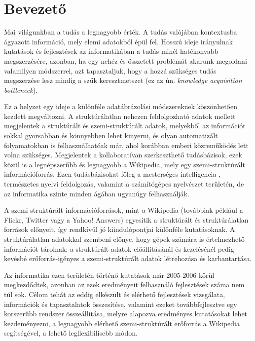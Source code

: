 
\chapter*{Bevezető}
\label{cha:intro}

Mai világunkban a tudás a legnagyobb érték. A tudás valójában kontextusba ágyazott információ, mely elemi adatokból épül fel. Hosszú ideje irányulnak kutatások és fejlesztések az informatikában a tudás minél hatékonyabb megszerzésére, azonban, ha egy nehéz és összetett problémát akarunk megoldani valamilyen módszerrel, azt tapasztaljuk, hogy a hozzá szükséges tudás megszerzése lesz mindig a szűk keresztmetszet (ez az ún. \textit{knowledge acquisition bottleneck}).

Ez a helyzet egy ideje a különféle adatábrázolási módszereknek köszönhetően kezdett megváltozni. A struktúrálatlan nehezen feldolgozható adatok mellett megjelentek a struktúrált és szemi-struktúrált adatok, melyekből az információt sokkal gyorsabban és könnyebben lehet kinyerni, és olyan automatizált folyamatokban is felhasználhatóak már, ahol korábban emberi közreműködés lett volna szükséges. Megjelentek a kollaboratívan szerkeszthető tudásbázisok, ezek közül is a legnépszerűbb és legnagyobb a Wikipedia, mely egy szemi-struktúrált információforrás. Ezen tudásbázisokat főleg a mesterséges intelligencia \cite{aijournal}, természetes nyelvi feldolgozás, valamint a számítógépes nyelvészet területén, de az informatika szinte minden ágában ugyanúgy felhasználják.

A szemi-struktúrált információforrások, mint a Wikipedia (továbbiak például a Flickr, Twitter vagy a Yahoo! Answers) egyesítik a struktúrált és struktúrálatlan források előnyeit, így rendkívül jó kiindulópontjai különféle kutatásoknak. A struktúrálatlan adatokkal szembeni előnye, hogy gépek számára is értelmezhető információt tárolnak; a struktúrált adatok előállításánál és kezelésénél pedig kevésbé erőforrás-igényes a szemi-struktúrált adatok létrehozása és karbantartása.

Az informatika ezen területén történő kutatások már 2005-2006 körül megkezdődtek, azonban az ezek eredményeit felhasználó fejlesztések száma nem túl sok. Célom tehát az eddig elkészült és elérhető fejlesztések vizsgálata, információk és tapasztalatok összesítése, valamint ezeket továbbfejlesztve egy korszerűbb rendszer összeállítása, melyre alapozva eredményes kutatásokat lehet kezdeményezni, a legnagyobb elérhető szemi-struktúrált erőforrás a Wikipedia segítségével, a lehető legflexibilisebb módon.

